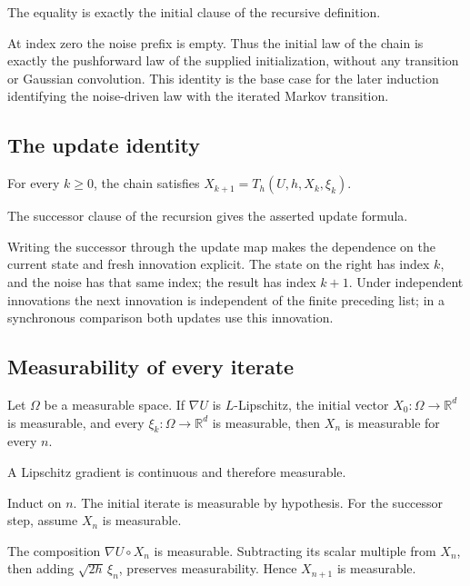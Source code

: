 \documentclass[11pt,a4paper]{report}
\begin{document}
The equality is exactly the initial clause of the recursive definition.



At index zero the noise prefix is empty. Thus the initial law of the chain is exactly the pushforward law of the supplied initialization, without any transition or Gaussian convolution. This identity is the base case for the later induction identifying the noise-driven law with the iterated Markov transition.

\subsection{\texorpdfstring{The update identity}{The update identity}}
\label{report-step-UnadjustedLangevin-Dynamics-lean-3}


For every \(k\ge0\), the chain satisfies \(X_{k+1}=T_h(U,h,X_k,\xi_k)\).



The successor clause of the recursion gives the asserted update formula.



Writing the successor through the update map makes the dependence on the current state and fresh innovation explicit. The state on the right has index \(k\), and the noise has that same index; the result has index \(k+1\). Under independent innovations the next innovation is independent of the finite preceding list; in a synchronous comparison both updates use this innovation.

\subsection{\texorpdfstring{Measurability of every iterate}{Measurability of every iterate}}
\label{report-step-UnadjustedLangevin-Dynamics-lean-4}


Let \(\Omega\) be a measurable space. If \(\nabla U\) is \(L\)-Lipschitz, the initial vector \(X_0:\Omega\to\mathbb R^d\) is measurable, and every \(\xi_k:\Omega\to\mathbb R^d\) is measurable, then \(X_n\) is measurable for every \(n\).



A Lipschitz gradient is continuous and therefore measurable.



Induct on \(n\). The initial iterate is measurable by hypothesis. For the successor step, assume \(X_n\) is measurable.



The composition \(\nabla U\circ X_n\) is measurable. Subtracting its scalar multiple from \(X_n\), then adding \(\sqrt{2h}\,\xi_n\), preserves measurability. Hence \(X_{n+1}\) is measurable.
\end{document}
